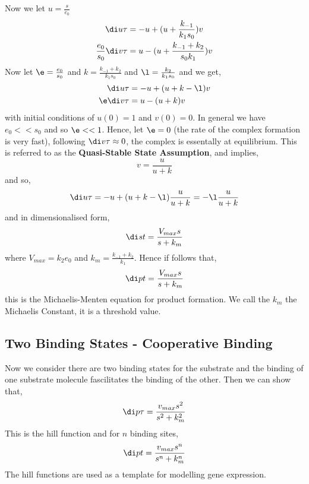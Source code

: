 Now we let $u = \frac{s}{e_0}$
\begin{align*}
  \di u \tau &= -u + (u + \frac{k_{-1}}{k_1s_0})v\\
  \frac{e_0}{s_0}\di v \tau &= u - (u + \frac{k_{-1}+k_2}{s_0k_1})v
\end{align*}
Now let $\e = \frac{e_0}{s_0}$ and $k = \frac{k_{-1} + k_2}{k_1s_0}$ and $\l = \frac{k_2}{k_1s_0}$ and we get,
\begin{align*}
  \di u \tau &= -u + (u + k - \l)v\\
  \e\di v \tau &= u - (u + k)v
\end{align*}
with initial conditions of $u(0) = 1$ and $v(0) = 0$. In general we have $e_0 << s_0$ and so $\e << 1$. Hence, let $\e = 0$ (the rate of the complex formation is very fast), following $\di v \tau \approx 0$, the complex is essentally at equilibrium. This is referred to as the \textbf{Quasi-Stable State Assumption}, and implies,
$$ v = \frac{u}{u+k} $$
and so,
$$ \di u \tau = -u + (u + k - \l)\frac{u}{u+k} = -\l \frac{u}{u+k} $$
and in dimensionalised form,
$$ \di s t = \frac{V_{max}s}{s + k_m} $$
where $V_{max} = k_2e_0$ and $k_m = \frac{k_{-1} + k_2}{k_1}$. Hence if follows that,
$$ \di p t = \frac{V_{max}s}{s + k_m} $$
this is the Michaelis-Menten equation for product formation. We call the $k_m$ the Michaelis Constant, it is a threshold value.\\

\subsection{Two Binding States - Cooperative Binding}
Now we consider there are two binding states for the substrate and the binding of one substrate molecule fascilitates the binding of the other. Then we can show that,
$$ \di p \tau = \frac{v_{max}s^2}{s^2 + k_m^2} $$
This is the hill function and for $n$ binding sites,
$$ \di p t = \frac{v_{max}s^n}{s^n + k_m^n} $$
The hill functions are used as a template for modelling gene expression.


